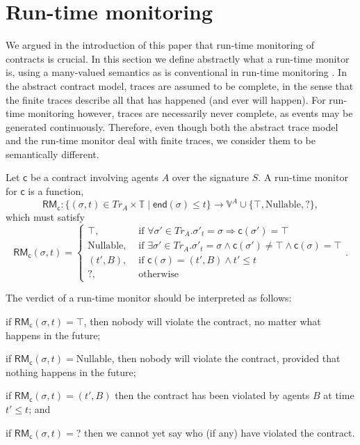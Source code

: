 \documentclass[orivec,final]{llncs-href}
\newcommand{\timeset}{\mathbb{T}}
\newcommand{\traceset}[1]{\mathit{Tr}_{#1}}
\newcommand{\verdictset}[1]{\mathbb{V}^{#1}}
\newcommand{\traceend}{\mathsf{end}}
\newcommand{\rmf}{\mathsf{RM}}
\newcommand{\trace}{\sigma}
\newcommand{\conforming}{\top}
\newcommand{\partialok}{\mathrm{Nullable}}
\newcommand{\inconclusive}{\mathrm{?}}
\newcommand{\contract}{\mathsf{c}}
\begin{document}
\section{Run-time monitoring}\label{sec:runtimemonitoring}
We argued in the introduction of this paper that run-time monitoring
of contracts is crucial. In this section we define abstractly what a
run-time monitor is, using a many-valued semantics as is conventional 
in run-time monitoring \cite{leucker09rv}. In the abstract contract model, traces
are assumed to be complete, in the sense that the finite traces
describe all that has happened (and ever will happen). For run-time
monitoring however, traces are necessarily never complete, as events
may be generated continuously. Therefore, even though both the
abstract trace model and the run-time monitor deal with finite
traces, we consider them to be semantically different.
\begin{definition}
  Let $\contract$ be a contract involving agents $A$ over the
  signature $S$. A run-time monitor for $\contract$ is a function,
  \[
  \rmf_\contract : \{ (\trace,t) \in \traceset{A} \times
  \timeset \mathbin{|} \traceend(\trace) \leq t \} \to
  \verdictset{A} \cup \{\conforming, \partialok, \inconclusive\},
 \]
  which must satisfy
  \[
  \rmf_\contract(\trace,t) = \left\{
    \begin{array}{ll}
      \conforming, & \mbox{ if } \forall \trace' \in
      \traceset{A}. \trace'_t = \trace \Rightarrow \contract(\trace') =
      \conforming\\
      \partialok, & \mbox{ if } \exists \trace' \in
      \traceset{A}. \trace'_t = \trace \land \contract(\trace') \neq
      \conforming \land \contract(\trace) = \conforming\\ 
      (t',B), & \mbox{ if } \contract(\trace) = (t',B) \land t' \leq t\\
      \inconclusive, & \mbox{ otherwise}
    \end{array} .
  \right.
  \]
\end{definition}

The verdict of a run-time monitor should be interpreted as follows:
\begin{inparaenum}[(i)]
\item if $\rmf_\contract(\trace,t) = \conforming$, then nobody will violate
  the contract, no matter what happens in the future;
\item if $\rmf_\contract(\trace,t) = \partialok$, then nobody will violate the
  contract, provided that nothing happens in the future;
\item if $\rmf_\contract(\trace,t) = (t',B)$ then the contract has been
  violated by agents $B$ at time $t' \leq t$; and
\item if $\rmf_\contract(\trace,t) = \inconclusive$ then we cannot yet
  say who (if any) have violated the contract.
\end{inparaenum}
\end{document}
